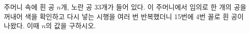 주머니 속에 흰 공 $n$개, 노란 공 33개가 들어 있다. 이 주머니에서 임의로 한 개의 공을 꺼내어 색을 확인하고 다시 넣는 시행을 여러 번 반복했더니 15번에 4번 꼴로 흰 공이 나왔다. 이때 $n$의 값을 구하시오.
